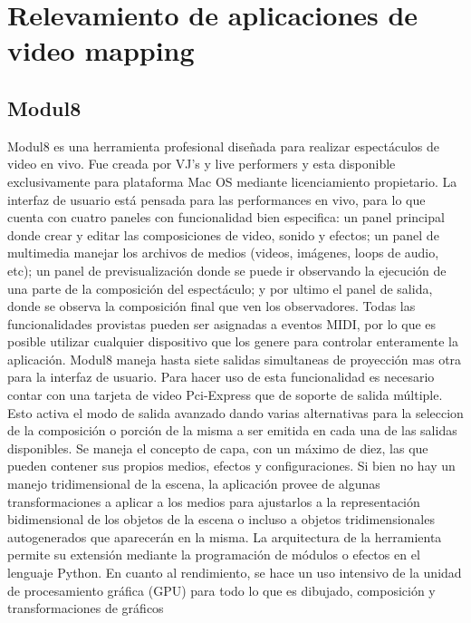 ﻿\chapter{Relevamiento de aplicaciones de video mapping}
\section{Modul8}
Modul8 es una herramienta profesional diseñada para realizar espectáculos de video en vivo. Fue creada por VJ's y live performers y esta disponible exclusivamente para plataforma Mac OS mediante licenciamiento propietario.
La interfaz de usuario está pensada para las performances en vivo, para lo que cuenta con cuatro paneles con funcionalidad bien especifica: un panel principal donde crear y editar las composiciones de video, sonido y efectos; un panel de multimedia manejar los archivos de medios (videos, imágenes, loops de audio, etc); un panel de previsualización donde se puede ir observando la ejecución de una parte de la composición del espectáculo; y por ultimo el panel de salida, donde se observa la composición final que ven los observadores. Todas las funcionalidades provistas pueden ser asignadas a eventos MIDI, por lo que es posible utilizar cualquier dispositivo que los genere para controlar enteramente la aplicación.
Modul8 maneja hasta siete salidas simultaneas de proyección mas otra para la interfaz de usuario. Para hacer uso de esta funcionalidad es necesario contar con una tarjeta de video Pci-Express que de soporte de salida múltiple. Esto activa el modo de salida avanzado dando varias alternativas para la seleccion de la composición o porción de la misma a ser emitida en cada una de las salidas disponibles.
Se maneja el concepto de capa, con un máximo de diez, las que pueden contener sus propios medios, efectos y configuraciones.
Si bien no hay un manejo tridimensional de la escena, la aplicación provee de algunas transformaciones a aplicar a los medios para ajustarlos a la representación bidimensional de los objetos de la escena o incluso a objetos tridimensionales autogenerados que aparecerán en la misma.
La arquitectura de la herramienta permite su extensión mediante la programación de módulos o efectos en el lenguaje Python. En cuanto al rendimiento, se hace un uso intensivo de la unidad de procesamiento gráfica (GPU) para todo lo que es dibujado, composición y transformaciones de gráficos
